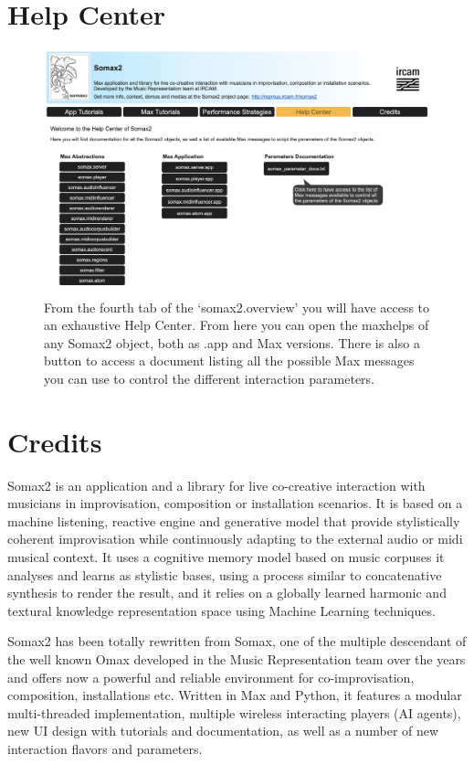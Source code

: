 \section{Help Center}

\begin{figure}[H]
    \centering        
 	\includegraphics[width=1\textwidth]{img/help_center.png}
    \caption{From the fourth tab of the `somax2.overview' you will have access to an exhaustive Help Center. From here you can open the maxhelps of any Somax2 object, both as .app and Max versions. There is also a button to access a document listing all the possible Max messages you can use to control the different interaction parameters.}
    \label{fig:help_center}
\end{figure}


\newpage
\section{Credits}

Somax2 is an application and a library for live co-creative interaction with musicians in improvisation, composition or installation scenarios. 
It is based on a machine listening, reactive engine and generative model that provide stylistically coherent improvisation while continuously adapting to the external audio or midi musical context. 
It uses a cognitive memory model based on music corpuses it analyses and learns as stylistic bases, using a process similar to concatenative synthesis to render the result, and it relies on a globally learned harmonic and textural knowledge representation space using Machine Learning techniques.

Somax2 has been totally rewritten from Somax, one of the multiple descendant of the well known Omax developed in the Music Representation team over the years and offers now a powerful and reliable environment for co-improvisation, composition, installations etc.
Written in Max and Python, it features a modular multi-threaded implementation, multiple wireless interacting players (AI agents), new UI design with tutorials and documentation, as well as a number of new interaction flavors and parameters.

